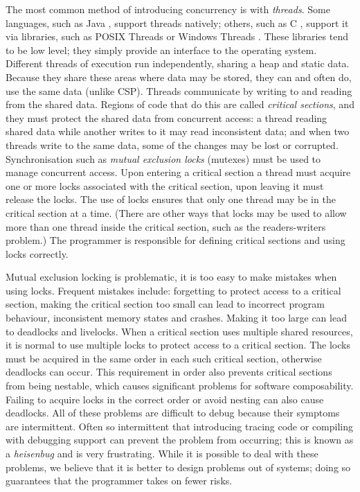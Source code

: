 The most common method of introducing concurrency is with \emph{threads}.
Some languages, such as Java \citep{java-threads}, 
support threads natively; 
others, such as C \citep{c}, support it via libraries,
such as
POSIX Threads \citep{butenhof1997:pthreads} or Windows
Threads \citep{winthreads}.
These libraries tend to be low level;
they simply provide an interface to the operating system.
Different threads of execution run independently,
sharing a heap and static data.
Because they share these areas where data may be stored,
they can and often do,
use the same data (unlike CSP).
Threads communicate by writing to and reading from the shared data.
Regions of code that do this are called \emph{critical sections},
and they must protect the shared data from concurrent access:
a thread reading shared data while another writes to it may read
inconsistent data;
and when two threads write to the same data,
some of the changes may be lost or corrupted.
Synchronisation such as \emph{mutual exclusion locks} (mutexes)
\citep{Dijkstra:Mutex} must be used to manage concurrent access.
Upon entering a critical section a thread must acquire one or more locks
associated with the critical section,
upon leaving it must release the locks.
The use of locks ensures that only one thread may be in the critical section
at a time.
(There are other ways that locks may be used to allow more than one thread
inside the critical section, such as the readers-writers problem.)
The programmer is responsible for defining critical sections and using locks
correctly.

Mutual exclusion locking is problematic,
it is too easy to make mistakes when using locks.
Frequent mistakes include: forgetting to protect access to a critical
section,
making the critical section too small
can lead to incorrect program behaviour, inconsistent memory states and
crashes.
Making it too large can lead to deadlocks and livelocks.
When a critical section uses multiple shared resources,
it is normal to use multiple locks to protect access to a critical section.
The locks must be acquired in the same order in each such critical section,
otherwise deadlocks can occur.
This requirement in order also prevents critical sections from being
nestable,
which causes significant problems for software composability.
Failing to acquire locks in the correct order or avoid nesting can also cause
deadlocks.
All of these problems are difficult to debug because their symptoms are
intermittent.
Often so intermittent that introducing tracing code or compiling with debugging
support can prevent the problem from occurring;
this is known as a \emph{heisenbug} and is very frustrating.
While it is possible to deal with these problems,
we believe that it is better to design problems out of systems;
doing so guarantees that the programmer takes on fewer risks.

